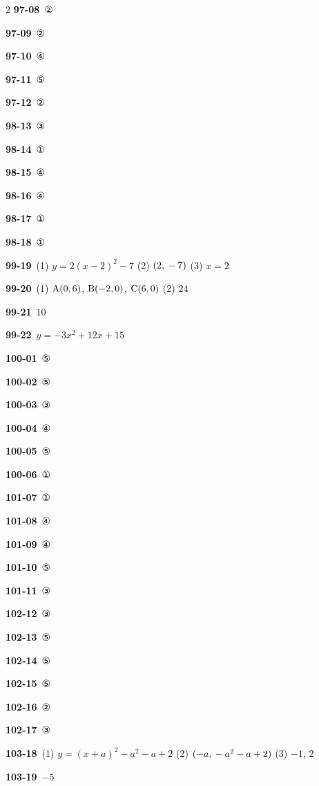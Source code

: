 \documentclass[10pt,a4paper]{article}
\newcommand{\pt}[1]{\mathrm{#1}}
\begin{document}
\begin{multicols}{2}
\noindent\textbf{97-08}\ ②\par
\noindent\textbf{97-09}\ ②\par
\noindent\textbf{97-10}\ ④\par
\noindent\textbf{97-11}\ ⑤\par
\noindent\textbf{97-12}\ ②\par
\noindent\textbf{98-13}\ ③\par
\noindent\textbf{98-14}\ ①\par
\noindent\textbf{98-15}\ ④\par
\noindent\textbf{98-16}\ ④\par
\noindent\textbf{98-17}\ ①\par
\noindent\textbf{98-18}\ ①\par
\noindent\textbf{99-19}\ (1) $y=2(x-2)^2-7$ (2) $(2{,}\mkern3mu -7)$ (3) $x=2$\par
\noindent\textbf{99-20}\ (1) $\pt{A}(0{,}\mkern3mu 6)$, $\pt{B}(-2{,}\mkern3mu 0)$, $\pt{C}(6{,}\mkern3mu 0)$ (2) $24$\par
\noindent\textbf{99-21}\ $10$\par
\noindent\textbf{99-22}\ $y=-3x^2+12x+15$\par
\noindent\textbf{100-01}\ ⑤\par
\noindent\textbf{100-02}\ ⑤\par
\noindent\textbf{100-03}\ ③\par
\noindent\textbf{100-04}\ ④\par
\noindent\textbf{100-05}\ ⑤\par
\noindent\textbf{100-06}\ ①\par
\noindent\textbf{101-07}\ ①\par
\noindent\textbf{101-08}\ ④\par
\noindent\textbf{101-09}\ ④\par
\noindent\textbf{101-10}\ ⑤\par
\noindent\textbf{101-11}\ ③\par
\noindent\textbf{102-12}\ ③\par
\noindent\textbf{102-13}\ ⑤\par
\noindent\textbf{102-14}\ ⑤\par
\noindent\textbf{102-15}\ ⑤\par
\noindent\textbf{102-16}\ ②\par
\noindent\textbf{102-17}\ ③\par
\noindent\textbf{103-18}\ (1) $y=(x+a)^2-a^2-a+2$ (2) $(-a{,}\mkern3mu -a^2-a+2)$ (3) $-1$, $2$\par
\noindent\textbf{103-19}\ $-5$\par

\end{multicols}
\end{document}
